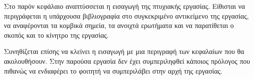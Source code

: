 Στο παρόν κεφάλαιο αναπτύσσεται η εισαγωγή της πτυχιακής εργασίας.
Είθισται να περιγράφεται η υπάρχουσα βιβλιογραφία στο συγκεκριμένο
αντικείμενο της εργασίας, να αναφέρονται τα κομβικά σημεία, τα ανοιχτά
ερωτήματα και να παρα\-τίθεται ο σκοπός και το κίνητρο της εργασίας.

Συνηθίζεται επίσης να κλείνει η εισαγωγή με μια περιγραφή των κεφαλαίων
που θα ακολουθήσουν. Στην παρούσα εργασία δεν έχει συμπεριληφθεί
κάποιος πρόλογος που πιθανώς να ενδιαφέρει το φοιτητή να συμπεριλάβει
στην αρχή της εργασίας.